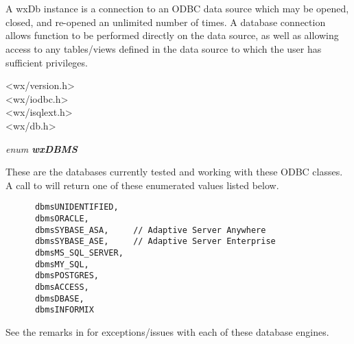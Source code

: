\section{}\label{wxdb}

A wxDb instance is a connection to an ODBC data source which may
be opened, closed, and re-opened an unlimited number of times.  A
database connection allows function to be performed directly on the
data source, as well as allowing access to any tables/views defined in
the data source to which the user has sufficient privileges.


<wx/version.h>\\
<wx/iodbc.h>\\
<wx/isqlext.h>\\
<wx/db.h>




{\it enum {\bf wxDBMS}}

These are the databases currently tested and working with these ODBC classes.  
A call to  will return one of these enumerated values listed below.

\begin{verbatim}
      dbmsUNIDENTIFIED,
      dbmsORACLE,
      dbmsSYBASE_ASA,     // Adaptive Server Anywhere
      dbmsSYBASE_ASE,     // Adaptive Server Enterprise
      dbmsMS_SQL_SERVER,
      dbmsMY_SQL,
      dbmsPOSTGRES,
      dbmsACCESS,
      dbmsDBASE,
      dbmsINFORMIX
\end{verbatim}

See the remarks in  for exceptions/issues with
each of these database engines.




